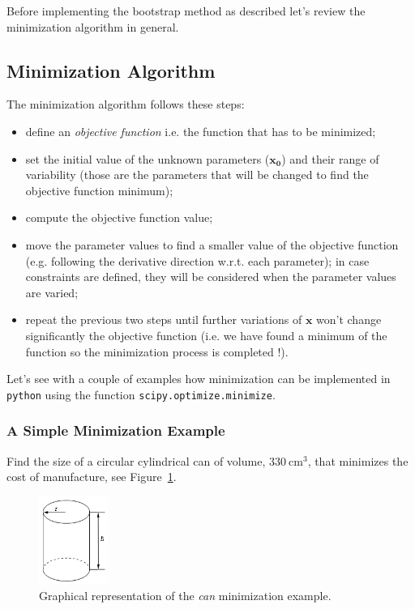 Before implementing the bootstrap method as described let's review the minimization algorithm in general.

\subsection{Minimization Algorithm}
\label{minimization-algorithm}

The minimization algorithm follows these steps:

\begin{itemize}
\tightlist
\item
  define an \emph{objective function} i.e. the function that has to be minimized;
\item
  set the initial value of the unknown parameters ($\mathbf{x_0}$) and their range of variability (those are the parameters that will be changed to find the objective function minimum);
\item
  compute the objective function value;
\item
  move the parameter values to find a smaller value of the objective function (e.g. following the derivative direction w.r.t. each parameter); in case constraints are defined, they will be considered when the parameter values are varied;
\item
  repeat the previous two steps until further variations of $\mathbf{x}$ won't change significantly the objective
  function (i.e. we have found a minimum of the function so the minimization process is completed !).
\end{itemize}

Let's see with a couple of examples how minimization can be implemented in \texttt{python} using the function \texttt{scipy.optimize.minimize}.

\subsubsection{A Simple Minimization Example}
\label{example}

Find the size of a circular cylindrical can of volume, $330~\mathrm{cm}^3$, that minimizes the cost of manufacture, see Figure~\ref{fig:cylinder}.

\begin{figure}[ht]
\centering
\includegraphics[width=0.2\textwidth]{figures/cylinder.png}
\caption{Graphical representation of the \emph{can} minimization example.}
\label{fig:cylinder}
\end{figure}


